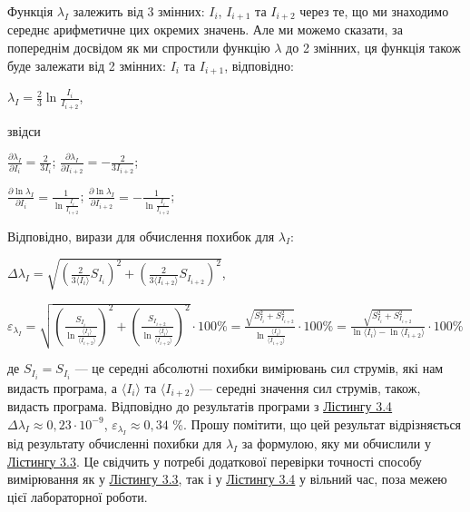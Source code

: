 \documentclass[12pt,a4paper]{article}
\begin{document}
    Функція $\lambda_I$ залежить від 3 змінних: $I_i$, $I_{i+1}$ та $I_{i+2}$ через те, що ми знаходимо середнє арифметичне цих окремих значень.
    Але ми можемо сказати, за попереднім досвідом як ми спростили функцію $\lambda$ до 2 змінних, ця функція також буде залежати від 2 змінних: $I_i$ та $I_{i+1}$, відповідно:

    \begin{center}
        $\displaystyle \lambda_I = \frac{2}{3} \ln \frac{I_i}{I_{i+2}}$,
    \end{center}

    звідси

    \begin{center}
        $\displaystyle \frac{\partial \lambda_I}{\partial I_i} = \frac{2}{3I_i}$; $\displaystyle \frac{\partial \lambda_I}{\partial I_{i+2}} = -\frac{2}{3I_{i+2}}$;
    \end{center}

    \begin{center}
        $\displaystyle \frac{\partial \ln \lambda_I}{\partial I_i} = \frac{1}{\ln \frac{I_i}{I_{i+2}}}$; $\displaystyle \frac{\partial \ln \lambda_I}{\partial I_{i+2}} = -\frac{1}{\ln \frac{I_i}{I_{i+2}}}$;
    \end{center}

    Відповідно, вирази для обчислення похибок для $\lambda_I$:

    \begin{center}
        $\displaystyle \Delta \lambda_I = \sqrt{\left( \frac{2}{3\text{⟨}I_i\text{⟩}} S_{I_i} \right)^2 + \left( \frac{2}{3\text{⟨}I_{i+2}\text{⟩}} S_{I_{i+2}}\right)^2}$,
    \end{center}

    \begin{center}
        $\displaystyle \varepsilon_{\lambda_I} = \sqrt{\left( \frac{S_{I_i}}{\ln \frac{\text{⟨}I_i\text{⟩}}{\text{⟨}I_{i+2}\text{⟩}}}\right)^2 + \left( \frac{S_{I_{i+2}}}{\ln \frac{\text{⟨}I_i\text{⟩}}{\text{⟨}I_{i+2}\text{⟩}}} \right)^2} \cdot 100 \% =
        \frac{\sqrt{S_{I_i}^2 + S_{I_{i+2}}^2}}{\ln \frac{\text{⟨}I_i\text{⟩}}{\text{⟨}I_{i+2}\text{⟩}}} \cdot 100 \% = \frac{\sqrt{S_{I_i}^2 + S_{I_{i+2}}^2}}{\ln \text{⟨}I_i\text{⟩} - \ln \text{⟨}I_{i+2}\text{⟩}} \cdot 100 \%$
    \end{center}

    де $S_{I_i} = S_{I_i}$ --- це середні абсолютні похибки вимірювань сил струмів, які нам видасть програма, а $\text{⟨}I_i\text{⟩}$ та $\text{⟨}I_{i+2}\text{⟩}$ --- середні значення сил струмів, також, видасть програма.
    Відповідно до результатів програми з \hyperlink{listing4}{Лістингу 3.4} $\Delta \lambda_I \approx 0,23 \cdot 10^{-9}$, $\varepsilon_{\lambda_I} \approx 0,34$ \%. Прошу помітити, що цей результат відрізняється від результату обчисленні похибки для $\lambda_I$ за формулою, яку ми обчислили у \hyperlink{listing3}{Лістингу 3.3}.
    Це свідчить у потребі додаткової перевірки точності способу вимірювання як у \hyperlink{listing3}{Лістингу 3.3}, так і у \hyperlink{listing4}{Лістингу 3.4} у вільний час, поза межею цієї лабораторної роботи.
\end{document}
